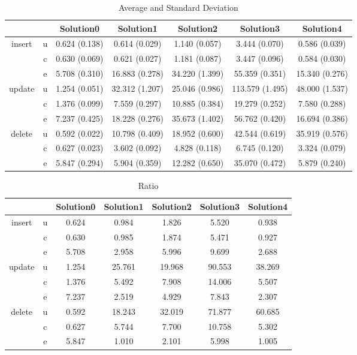 \begin{table}[h]
\newcommand{\B}[1]{\colorbox{light-gray}{#1}}
 \centering
\caption{Average and Standard Deviation}\label{t:}
\begin{tabular}{ccccccc}
\toprule
&&Solution0 & Solution1 & Solution2 & Solution3 & Solution4\\
\midrule
\multirow{3}{*}{insert} & u & 0.624 (0.138) & 0.614 (0.029) & 1.140 (0.057) & 3.444 (0.070) & 0.586 (0.039)\\
 & c & 0.630 (0.069) & 0.621 (0.027) & 1.181 (0.087) & 3.447 (0.096) & 0.584 (0.030)\\
 & e & 5.708 (0.310) & 16.883 (0.278) & 34.220 (1.399) & 55.359 (0.351) & 15.340 (0.276)\\
\midrule
\multirow{3}{*}{update} & u & 1.254 (0.051) & 32.312 (1.207) & 25.046 (0.986) & 113.579 (1.495) & 48.000 (1.537)\\
 & c & 1.376 (0.099) & 7.559 (0.297) & 10.885 (0.384) & 19.279 (0.252) & 7.580 (0.288)\\
 & e & 7.237 (0.425) & 18.228 (0.276) & 35.673 (1.402) & 56.762 (0.420) & 16.694 (0.386)\\
\midrule
\multirow{3}{*}{delete} & u & 0.592 (0.022) & 10.798 (0.409) & 18.952 (0.600) & 42.544 (0.619) & 35.919 (0.576)\\
 & c & 0.627 (0.023) & 3.602 (0.092) & 4.828 (0.118) & 6.745 (0.120) & 3.324 (0.079)\\
 & e & 5.847 (0.294) & 5.904 (0.359) & 12.282 (0.650) & 35.070 (0.472) & 5.879 (0.240)\\
\bottomrule
\end{tabular}
\end{table}

\begin{table}[h]
\newcommand{\B}[1]{\colorbox{light-gray}{#1}}
 \centering
\caption{Ratio}\label{t:}
\begin{tabular}{ccccccc}
\toprule
&&Solution0 & Solution1 & Solution2 & Solution3 & Solution4\\
\midrule
\multirow{3}{*}{insert} & u & 0.624 & 0.984 & 1.826 & 5.520 & 0.938\\
 & c & 0.630 & 0.985 & 1.874 & 5.471 & 0.927\\
 & e & 5.708 & 2.958 & 5.996 & 9.699 & 2.688\\
\midrule
\multirow{3}{*}{update} & u & 1.254 & 25.761 & 19.968 & 90.553 & 38.269\\
 & c & 1.376 & 5.492 & 7.908 & 14.006 & 5.507\\
 & e & 7.237 & 2.519 & 4.929 & 7.843 & 2.307\\
\midrule
\multirow{3}{*}{delete} & u & 0.592 & 18.243 & 32.019 & 71.877 & 60.685\\
 & c & 0.627 & 5.744 & 7.700 & 10.758 & 5.302\\
 & e & 5.847 & 1.010 & 2.101 & 5.998 & 1.005\\
\bottomrule
\end{tabular}
\end{table}
